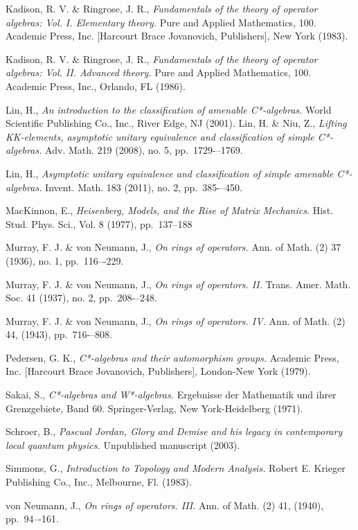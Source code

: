 \documentclass[12pt,a4paper]{amsart}
\theoremstyle{plain}
\theoremstyle{definition}
\begin{document}
\begin{thebibliography}{00}
	Kadison, R. V. \& Ringrose, J. R.,
	\emph{Fundamentals of the theory of operator algebras: Vol. I. Elementary theory.}
	Pure and Applied Mathematics, 100. Academic Press, Inc. [Harcourt Brace Jovanovich, Publishers], New York (1983).

	Kadison, R. V. \& Ringrose, J. R.,
	\emph{Fundamentals of the theory of operator algebras: Vol. II. Advanced theory.}
	Pure and Applied Mathematics, 100. Academic Press, Inc., Orlando, FL (1986).
	
	Lin, H.,
	\emph{An introduction to the classification of amenable C*-algebras.}
	World Scientific Publishing Co., Inc., River Edge, NJ (2001).
	Lin, H. \& Niu, Z.,
	\emph{Lifting KK-elements, asymptotic unitary equivalence and classification of simple C*-algebras.}
	Adv. Math. 219 (2008), no. 5, pp.~1729-–1769. 
	
	Lin, H.,
	\emph{Asymptotic unitary equivalence and classification of simple amenable C*-algebras.}
	Invent. Math. 183 (2011), no. 2, pp.~385-–450. 

	MacKinnon, E.,
	\emph{Heisenberg, Models, and the Rise of Matrix Mechanics.}
	Hist. Stud. Phys. Sci., Vol. 8 (1977), pp.~137--188
	
	Murray, F. J. \& von Neumann, J.,
	\emph{On rings of operators.}
	Ann. of Math. (2) 37 (1936), no. 1, pp.~116–-229.

	Murray, F. J. \& von Neumann, J.,
	\emph{On rings of operators. II.}
	Trans. Amer. Math. Soc. 41 (1937), no. 2, pp.~208-–248. 

	Murray, F. J. \& von Neumann, J.,
	\emph{On rings of operators. IV.}
	Ann. of Math. (2) 44, (1943), pp.~716-–808.
	
	Pedersen, G. K.,
	\emph{C*-algebras and their automorphism groups.}
	Academic Press, Inc. [Harcourt Brace Jovanovich, Publishers], London-New York (1979).

	Sakai, S.,
	\emph{C*-algebras and W*-algebras.}
	Ergebnisse der Mathematik und ihrer Grenzgebiete, Band 60. Springer-Verlag, New York-Heidelberg (1971).

	Schroer, B.,
	\emph{Pascual Jordan, Glory and Demise and his legacy in contemporary local quantum physics.}
	Unpublished manuscript (2003).
	
	Simmons, G.,
	\emph{Introduction to Topology and Modern Analysis.}
	Robert E. Krieger Publishing Co., Inc., Melbourne, Fl. (1983).

	von Neumann, J.,
	\emph{On rings of operators. III.}
	Ann. of Math. (2) 41, (1940), pp.~94–-161.

	
\end{thebibliography}
\end{document}
